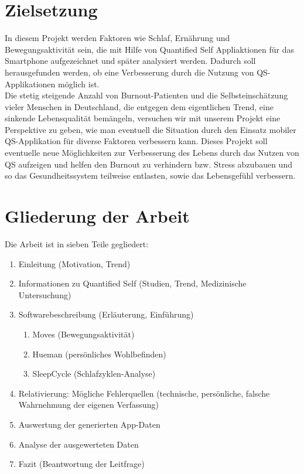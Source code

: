 \section{Zielsetzung}
\label{ch:Einleitung:sec:Zielsetzung}

In diesem Projekt werden Faktoren wie Schlaf, Ernährung und Bewegungsaktivität sein, die mit Hilfe von Quantified Self Appliaktionen für das Smartphone aufgezeichnet und später analysiert werden. %
Dadurch soll herausgefunden werden, ob eine Verbesserung durch die Nutzung von QS-Applikationen möglich ist. \\
Die stetig steigende Anzahl von Burnout-Patienten und die Selbsteinschätzung vieler Menschen in Deutschland, die entgegen dem eigentlichen Trend, eine sinkende Lebensqualität bemängeln, versuchen wir mit unserem Projekt eine Perspektive zu geben, wie man eventuell die Situation durch den Einsatz mobiler QS-Applikation für diverse Faktoren verbessern kann. 
Dieses Projekt soll eventuelle neue Möglichkeiten zur Verbesserung des Lebens durch das Nutzen von QS aufzeigen und helfen den Burnout zu verhindern bzw. Stress abzubauen und so das Gesundheitssystem teilweise entlasten, sowie das Lebensgefühl verbessern. 

\section{Gliederung der Arbeit}
\label{ch:Einleitung:sec:GliederungDerArbeit}

Die Arbeit ist in sieben Teile gegliedert:

\begin{enumerate}
\def\labelenumi{\arabic{enumi}.}
\itemsep1pt\parskip0pt
\item
  Einleitung (Motivation, Trend)
\item
  Informationen zu Quantified Self (Studien, Trend, Medizinische
  Untersuchung)
\item
  Softwarebeschreibung (Erläuterung, Einführung)

  \begin{enumerate}
  \def\labelenumii{\alph{enumii}.}
  \itemsep1pt\parskip0pt
  \item
    Moves (Bewegungsaktivität)\\
  \item
    Hueman (persönliches Wohlbefinden)\\
  \item
    SleepCycle (Schlafzyklen-Analyse)
  \end{enumerate}
\item
  Relativierung: Mögliche Fehlerquellen (technische, persönliche,
  falsche Wahrnehmung der eigenen Verfassung)
\item
  Auswertung der generierten App-Daten
\item
  Analyse der ausgewerteten Daten
\item
  Fazit (Beantwortung der Leitfrage)
\end{enumerate}


